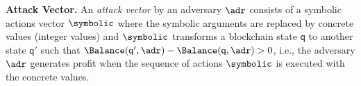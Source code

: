 

%
%
\noindent
\textbf{Attack Vector.}
    An \emph{attack vector} by an adversary $\adr$ consists of a symbolic actions vector $\symbolic$ where the symbolic arguments are replaced by concrete values (integer values) and $\symbolic$ transforms a blockchain state $\mathsf{q}$ to another state $\mathsf{q}'$ such that $\Balance(\mathsf{q}',\adr) -  \Balance(\mathsf{q},\adr) > 0$, i.e., the adversary $\adr$ generates profit when the sequence of actions $\symbolic$ is executed with the concrete values. 







